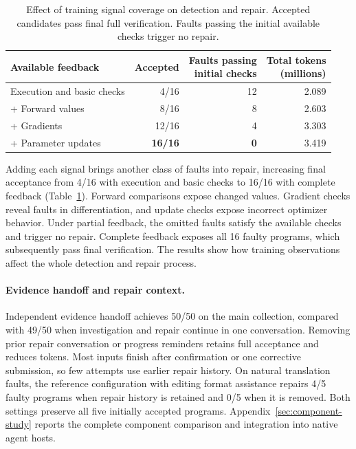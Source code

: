 \documentclass{article}
\newcommand{\thead}[1]{\textbf{\shortstack[b]{#1}}}
\begin{document}
\begin{table}[!htb]
\caption{Effect of training signal coverage on detection and repair. Accepted candidates pass final full verification. Faults passing the initial available checks trigger no repair.}
\label{tab:signal-ablation}
\centering
\small
\setlength{\tabcolsep}{4pt}

\begin{tabular*}{\linewidth}{@{\extracolsep{\fill}}lrrr@{}}
\toprule
\textbf{Available feedback} & \textbf{Accepted} & \thead{Faults passing\\initial checks} & \thead{Total tokens\\(millions)} \\
\midrule
Execution and basic checks & 4/16 & 12 & 2.089 \\
\quad + Forward values & 8/16 & 8 & 2.603 \\
\quad + Gradients & 12/16 & 4 & 3.303 \\
\quad + Parameter updates & \textbf{16/16} & \textbf{0} & 3.419 \\
\bottomrule
\end{tabular*}


\end{table}

Adding each signal brings another class of faults into repair, increasing final acceptance from 4/16 with execution and basic checks to 16/16 with complete feedback (Table~\ref{tab:signal-ablation}). Forward comparisons expose changed values. Gradient checks reveal faults in differentiation, and update checks expose incorrect optimizer behavior. Under partial feedback, the omitted faults satisfy the available checks and trigger no repair. Complete feedback exposes all 16 faulty programs, which subsequently pass final verification. The results show how training observations affect the whole detection and repair process.

\paragraph{Evidence handoff and repair context.}
Independent evidence handoff achieves 50/50 on the main collection, compared with 49/50 when investigation and repair continue in one conversation. Removing prior repair conversation or progress reminders retains full acceptance and reduces tokens. Most inputs finish after confirmation or one corrective submission, so few attempts use earlier repair history. On natural translation faults, the reference configuration with editing format assistance repairs 4/5 faulty programs when repair history is retained and 0/5 when it is removed. Both settings preserve all five initially accepted programs. Appendix~\ref{sec:component-study} reports the complete component comparison and integration into native agent hosts.
\end{document}
